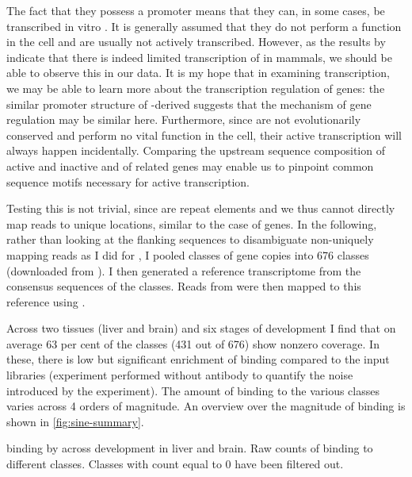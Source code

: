 The fact that they possess a  promoter means that they can, in some cases,
be transcribed in vitro \citep{White:1998}. It is generally assumed that they do
not perform a function in the cell and are usually not actively transcribed.
However, as the results by \citet{Carriere:2012} indicate that there is indeed
limited transcription of \transsine in mammals, we should be able to observe
this in our  \chip data. It is my hope that in examining \transsine
transcription, we may be able to learn more about the transcription regulation
of \trna genes: the similar promoter structure of \trna-derived \transsine[s]
suggests that the mechanism of gene regulation may be similar here. Furthermore,
since \transsine[s] are not evolutionarily conserved and perform no vital
function in the cell, their active transcription will always happen
incidentally. Comparing the upstream sequence composition of active and inactive
\transsine[s] and of related \trna genes may enable us to pinpoint common
sequence motifs necessary for active transcription.

Testing this is not trivial, since \transsine[s] are repeat elements and we thus
cannot directly map reads to unique locations, similar to the case of \trna
genes. In the following, rather than looking at the flanking sequences to
disambiguate non-uniquely mapping reads as I did for \trna, I pooled classes of
\transsine gene copies into \num{676} classes (downloaded from 
\citep{Jurka:2005}). I then generated a reference transcriptome from the
consensus sequences of the \transsine classes. Reads from  \chipseq were
then mapped to this reference using .

Across two tissues (liver and brain) and six stages of development I find that
on average \num{63} per cent of the \transsine classes (\num{431} out of
\num{676}) show nonzero coverage. In these, there is low but significant
enrichment of  binding compared to the input libraries (\chipseq experiment
performed without antibody to quantify the noise introduced by the experiment).
The amount of  binding to the various \transsine classes varies across
\num{4} orders of magnitude. An overview over the magnitude of binding is shown
in \cref{fig:sine-summary}.

    { binding by  across development in liver and
    brain.}
    {Raw counts of  binding to different  classes.
    Classes with count equal to \num{0} have been filtered out.}

